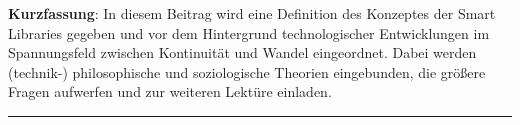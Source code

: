 \textbf{Kurzfassung}: In diesem Beitrag wird eine Definition des
Konzeptes der Smart Libraries gegeben und vor dem Hintergrund
technologischer Entwicklungen im Spannungsfeld zwischen Kontinuität und
Wandel eingeordnet. Dabei werden (technik-) philosophische und
soziologische Theorien eingebunden, die größere Fragen aufwerfen und zur
weiteren Lektüre einladen.

\begin{center}\rule{0.5\linewidth}{0.5pt}\end{center}